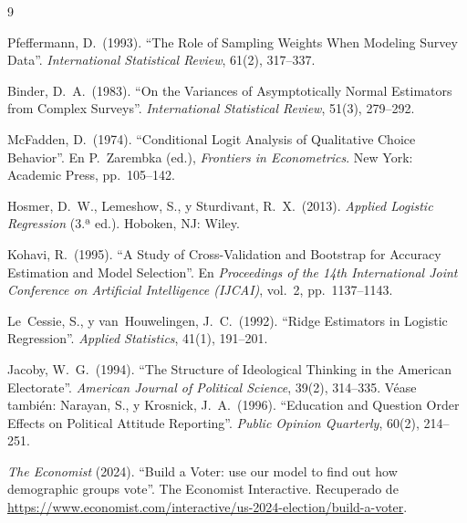\documentclass[11pt,a4paper]{article}
\begin{document}
\begin{thebibliography}{9}

Pfeffermann, D.\ (1993). ``The Role of Sampling Weights When Modeling Survey Data''. \textit{International Statistical Review}, 61(2), 317--337.

Binder, D.\ A.\ (1983). ``On the Variances of Asymptotically Normal Estimators from Complex Surveys''. \textit{International Statistical Review}, 51(3), 279--292.

McFadden, D.\ (1974). ``Conditional Logit Analysis of Qualitative Choice Behavior''. En P.\ Zarembka (ed.), \textit{Frontiers in Econometrics}. New York: Academic Press, pp.\ 105--142.

Hosmer, D.\ W., Lemeshow, S., y Sturdivant, R.\ X.\ (2013). \textit{Applied Logistic Regression} (3.ª ed.). Hoboken, NJ: Wiley.

Kohavi, R.\ (1995). ``A Study of Cross-Validation and Bootstrap for Accuracy Estimation and Model Selection''. En \textit{Proceedings of the 14th International Joint Conference on Artificial Intelligence (IJCAI)}, vol.\ 2, pp.\ 1137--1143.

Le~Cessie, S., y van~Houwelingen, J.\ C.\ (1992). ``Ridge Estimators in Logistic Regression''. \textit{Applied Statistics}, 41(1), 191--201.

Jacoby, W.\ G.\ (1994). ``The Structure of Ideological Thinking in the American Electorate''. \textit{American Journal of Political Science}, 39(2), 314--335. Véase también: Narayan, S., y Krosnick, J.\ A.\ (1996). ``Education and Question Order Effects on Political Attitude Reporting''. \textit{Public Opinion Quarterly}, 60(2), 214--251.

\textit{The Economist} (2024). ``Build a Voter: use our model to find out how demographic groups vote''. The Economist Interactive. Recuperado de \url{https://www.economist.com/interactive/us-2024-election/build-a-voter}.

\end{thebibliography}
\end{document}
